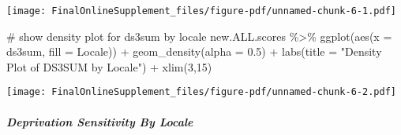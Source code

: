 \documentclass[
  letterpaper,
  DIV=11,
  numbers=noendperiod]{scrartcl}
\let\oldsubparagraph\subparagraph
\renewcommand{\subparagraph}[1]{\oldsubparagraph{#1}\mbox{}}
\newenvironment{Shaded}{\begin{snugshade}}{\end{snugshade}}
\newcommand{\AttributeTok}[1]{\textcolor[rgb]{0.40,0.45,0.13}{#1}}
\newcommand{\CommentTok}[1]{\textcolor[rgb]{0.37,0.37,0.37}{#1}}
\newcommand{\DecValTok}[1]{\textcolor[rgb]{0.68,0.00,0.00}{#1}}
\newcommand{\FloatTok}[1]{\textcolor[rgb]{0.68,0.00,0.00}{#1}}
\newcommand{\FunctionTok}[1]{\textcolor[rgb]{0.28,0.35,0.67}{#1}}
\newcommand{\NormalTok}[1]{\textcolor[rgb]{0.00,0.23,0.31}{#1}}
\newcommand{\SpecialCharTok}[1]{\textcolor[rgb]{0.37,0.37,0.37}{#1}}
\newcommand{\StringTok}[1]{\textcolor[rgb]{0.13,0.47,0.30}{#1}}
\begin{document}
\texttt{[image: FinalOnlineSupplement\_files/figure-pdf/unnamed-chunk-6-1.pdf]}

\begin{Shaded}
\begin{Highlighting}[]
\CommentTok{\# show density plot for ds3sum by locale}
\NormalTok{new.ALL.scores }\SpecialCharTok{\%\textgreater{}\%}
  \FunctionTok{ggplot}\NormalTok{(}\FunctionTok{aes}\NormalTok{(}\AttributeTok{x =}\NormalTok{ ds3sum, }
             \AttributeTok{fill =}\NormalTok{ Locale)) }\SpecialCharTok{+}
  \FunctionTok{geom\_density}\NormalTok{(}\AttributeTok{alpha =} \FloatTok{0.5}\NormalTok{) }\SpecialCharTok{+}
  \FunctionTok{labs}\NormalTok{(}\AttributeTok{title =} \StringTok{"Density Plot of DS3SUM by Locale"}\NormalTok{) }\SpecialCharTok{+}
  \FunctionTok{xlim}\NormalTok{(}\DecValTok{3}\NormalTok{,}\DecValTok{15}\NormalTok{)}
\end{Highlighting}
\end{Shaded}

\texttt{[image: FinalOnlineSupplement\_files/figure-pdf/unnamed-chunk-6-2.pdf]}

\subparagraph{Deprivation Sensitivity By
Locale}\label{deprivation-sensitivity-by-locale}
\end{document}
